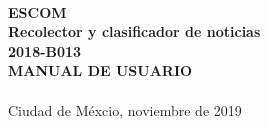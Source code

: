 \begin{center}


\ \\[1cm]

\textbf{ \LARGE{ESCOM}}\\[1cm]

  \textbf{ \LARGE{R}\LARGE{ecolector} \LARGE{y} \LARGE{clasificador} \LARGE{de}  
  \LARGE{noticias}}\\[1cm]
  
  \large{\textbf{2018-B013}}\\[1cm]

  \textbf{ \LARGE{MANUAL DE USUARIO}}\\[1cm]


     \ \\[5cm]
     Ciudad de Méxcio, noviembre de 2019
  

\end{center}